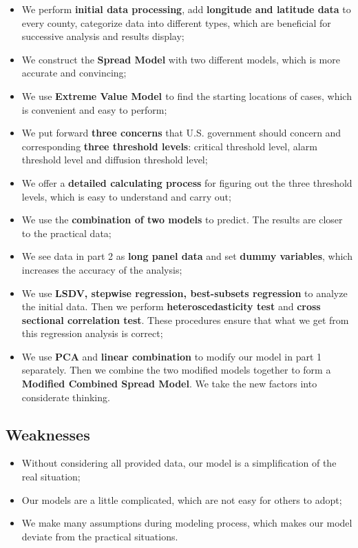 \documentclass{mcmthesis}
\numberwithin{equation}{section}
\numberwithin{figure}{section}
\numberwithin{table}{section}
\theoremstyle{mydef}
\begin{document}
\begin{itemize}
  \item We perform {\bf{initial data processing}}, add {\bf{longitude and latitude data}} to every county, categorize data into different types, which are beneficial for successive analysis and results display;
  \item We construct the {\bf{Spread Model}} with two different models, which is more accurate and convincing;
  \item We use {\bf{Extreme Value Model }} to find the starting locations of cases, which is convenient and easy to perform;
  \item We put forward {\bf{three concerns}} that U.S. government should concern and corresponding {\bf{three threshold levels}}: critical threshold level, alarm threshold level and diffusion threshold level;
  \item We offer a {\bf{detailed calculating process}} for figuring out the three threshold levels, which is easy to understand and carry out;
  \item We use the {\bf{combination of two models}} to predict. The results are closer to the practical data;
  \item We see data in part 2 as {\bf{long panel data}} and set {\bf{dummy variables}}, which increases the accuracy of the analysis;
  \item We use {\bf{LSDV, stepwise regression, best-subsets regression}} to analyze the initial data. Then we perform {\bf{heteroscedasticity  test}} and {\bf{cross sectional correlation test}}. These procedures ensure that what we get from this regression analysis is correct;
  \item We use {\bf{PCA}} and {\bf{linear combination}} to modify our model in part 1 separately. Then we combine the two modified models together to form a {\bf{Modified Combined Spread Model}}. We take the new factors into considerate thinking.
\end{itemize}

\subsection{Weaknesses}
\begin{itemize}
  \item Without considering all provided data, our model is a simplification of the real situation;
  \item Our models are a little complicated, which are not easy for others to adopt;
  \item We make many assumptions during modeling process, which makes our model deviate from the practical situations.
\end{itemize}
 
\end{document}
